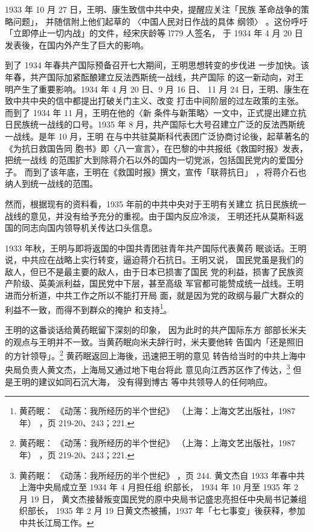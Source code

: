 1933 年 10 月 27 日，王明、康生致信中共中央，提醒应关注「民族
革命战争的策略问题」， 并随信附上他们起草的
〈中国人民对日作战的具体
纲领〉 。这份呼吁「立即停止一切内战」的文件，经宋庆龄等 l779 人签名，
于 1934 年 4 月 20 日发表後，在国内外产生了巨大的影响。

到了 1934 年春共产国际预备召开七大期间，王明思想转变的步伐进
一步加快。该年春，共产国际加紧酝酿建立反法西斯统一战线，共产国际
的这一新动向，对王明产生了重要影响。1934 年 4 月 20 日、9 月 16 日、
11 月 24 日，王明、康生在致中共中央的信中都提出打破关门主义、改变
打击中间阶层的过左政策的主张。而到了 1934 年 11 月，王明在他的〈新
条件与新策略〉一文中，正式提出建立抗日民族统一战线的口号。1935 年
8 月，共产国际七大号召建立广泛的反法西斯统一战线。是年 10 月，王明
在与中共驻莫斯科代表团广泛协商讨论後，起草著名的《为抗日救国告同
胞书》即〈八一宣言〉，在巴黎的中共报纸《救国时报》发表，把统一战线
的范围扩大到除蒋介石以外的国内一切党派，包括国民党内的爱国分子。
而到了该年底，王明在《救国时报》撰文，宣传「联蒋抗日」
，将蒋介石也 纳人到统一战线的范围。

然而，根据现有的资料看，1935 年前的中共中央对于王明有关建立
抗日民族统一战线的意见，并没有给予充分的重视。由于国内反应冷淡，
王明还托从莫斯科返国的同志向国内领导机关传达口头信息。

1933 年秋，王明与即将返国的中国共青团驻青年共产国际代表黄药
眠谈话。王明说，中共应在战略上实行转变，逼迫蒋介石抗日。王明又说，
国民党虽是我们的敌人，但已不是最主要的敌人，由于日本已损害了国民
党的利益，损害了民族资产阶级、英美派利益，国民党中下层，甚至高级
军官都可能赞成统一战线。王明进而分析道，中共工作之所以不能打开局
面，就是因为党的政纲与最广大群众的利益不一致，而得不到群众的掩护
和支持\footnote{黄药眠：
《动荡：我所经历的半个世纪》
（上海：上海文艺出版社，1987 年）
，页 219-20、243；221.}。

王明的这番谈话给黄药眠留下深刻的印象，
因为此时的共产国际东方
部部长米夫的观点与王明并不一致。当黄药眠向米夫辞行时，米夫要他转
告国内「还是照旧的方针领导」。\footnote{黄药眠：
《动荡：我所经历的半个世纪》
（上海：上海文艺出版社，1987 年）
，页 219-20、243；221.} 黄药眠返回上海後，迅速把王明的意见
转告给当时的中共上海中央局负责人黄文杰，上海局又通过地下电台将此
意见向江西苏区作了传达，\footnote{黄药眠：
《动荡：我所经历的半个世纪》
，页 244. 黄文杰自 1933 年春中共上海中央局成立至 1934 年 4 月担任组
织部长，
1934 年 10 月至 1935 年 2 月 19 日，
黄文杰接替叛变国民党的原中央局书记盛忠亮担任中央局书记兼组织部长，
1935 年 2 月 19 日黄文杰被捕，1937 年「七七事变」後获释，参加中共长江局工作。}
但是王明的建议如同石沉大海， 没有得到博古
等中共领导人的任何响应。

